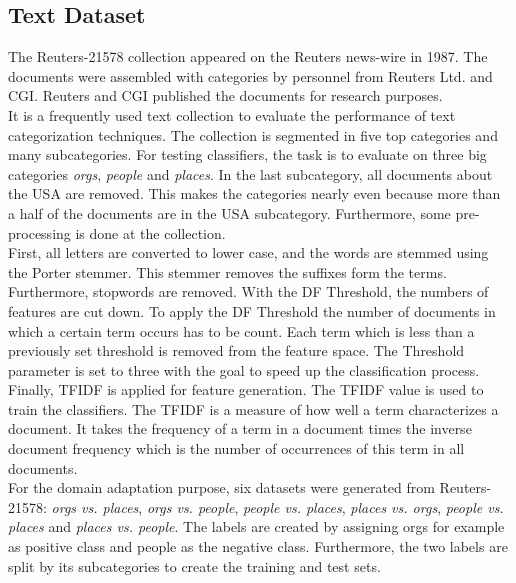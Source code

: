 \subsection{Text Dataset}\label{EmSubSecText}
The Reuters-21578 collection appeared on the Reuters news-wire in 1987.
The documents were assembled with categories by personnel from Reuters Ltd. and \ac{CGI}.
Reuters and \acs{CGI} published the documents for research purposes.\cite{DavidD.Lewis.2004}\\
It is a frequently used text collection to evaluate the performance of text categorization techniques.
The collection is segmented in five top categories and many subcategories.
For testing classifiers, the task is to evaluate on three big categories \textit{orgs}, \textit{people} and \textit{places}. 
In the last subcategory, all documents about the USA are removed.
This makes the categories nearly even because more than a half of the documents are in the USA subcategory. 
Furthermore, some pre-processing is done at the collection.\cite{WenyuanDai.2007}\\
First, all letters are converted to lower case, and the words are stemmed using the Porter stemmer.
This stemmer removes the suffixes form the terms.\cite{Porter.1997} 
Furthermore, stopwords are removed. With the \ac{DF} Threshold, the numbers of features are cut down.
To apply the \acs{DF} Threshold the number of documents in which a certain term occurs has to be count.
Each term which is less than a previously set threshold is removed from the feature space.\cite{Yang.1997}
The Threshold parameter is set to three with the goal to speed up the classification process.
Finally, \ac{TFIDF} is applied for feature generation.
The \acs{TFIDF} value is used to train the classifiers.
The \acs{TFIDF} is a measure of how well a term characterizes a document.
It takes the frequency of a term in a document times the inverse document frequency which is the number of occurrences of this term in all documents. \cite[p. 26]{Leskovec.2014}\\
For the domain adaptation purpose, six datasets were generated from Reuters-21578:
\textit{orgs vs. places}, \textit{orgs vs. people}, \textit{people vs. places}, \textit{places vs. orgs}, \textit{people vs. places} and \textit{places vs. people}.
The labels are created by assigning orgs for example as positive class and people as the negative class.
Furthermore, the two labels are split by its subcategories to create the training and test sets.\cite{WenyuanDai.2007}\\
